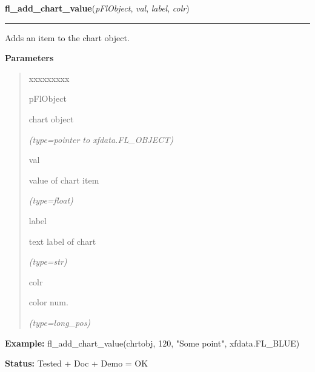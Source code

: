     \label{xformslib:flchart:fl_add_chart_value}

    \vspace{0.5ex}

\hspace{.8\funcindent}\begin{boxedminipage}{\funcwidth}

    \raggedright \textbf{fl\_add\_chart\_value}(\textit{pFlObject}, \textit{val}, \textit{label}, \textit{colr})

    \vspace{-1.5ex}

    \rule{\textwidth}{0.5\fboxrule}
\setlength{\parskip}{2ex}
    Adds an item to the chart object.

\setlength{\parskip}{1ex}
      \textbf{Parameters}
      \vspace{-1ex}

      \begin{quote}
        \begin{Ventry}{xxxxxxxxx}

          \item[pFlObject]

          chart object

            {\it (type=pointer to xfdata.FL\_OBJECT)}

          \item[val]

          value of chart item

            {\it (type=float)}

          \item[label]

          text label of chart

            {\it (type=str)}

          \item[colr]

          color num.

            {\it (type=long\_pos)}

        \end{Ventry}

      \end{quote}

\textbf{Example:} fl\_add\_chart\_value(chrtobj, 120, "Some point", xfdata.FL\_BLUE)



\textbf{Status:} Tested + Doc + Demo = OK



    \end{boxedminipage}

